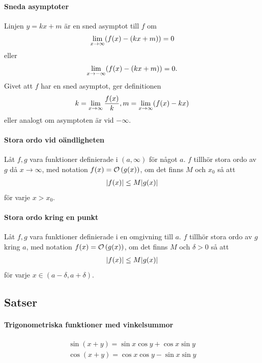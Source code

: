 \paragraph{Sneda asymptoter}
Linjen $y = kx + m$ är en sned asymptot till $f$ om
\begin{align*}
	\lim\limits_{x\to \infty}(f(x) - (kx + m)) = 0
\end{align*}
eller
\begin{align*}
	\lim\limits_{x\to -\infty}(f(x) - (kx + m)) = 0.
\end{align*}
Givet att $f$ har en sned asymptot, ger definitionen
\begin{align*}
	k = \lim\limits_{x\to \infty}\frac{f(x)}{k}, m = \lim\limits_{x\to \infty}(f(x) - kx)
\end{align*}
eller analogt om asymptoten är vid $-\infty$.

\paragraph{Stora ordo vid oändligheten}
Låt $f, g$ vara funktioner definierade i $(a, \infty)$ för något $a$. $f$ tillhör stora ordo av $g$ då $x\to\infty$, med notation $f(x) = \mathcal{O}\left(g(x)\right)$, om det finns $M$ och $x_0$ så att
\begin{align*}
	\abs{f(x)}\leq M\abs{g(x)}
\end{align*}
för varje $x > x_0$.

\paragraph{Stora ordo kring en punkt}
Låt $f, g$ vara funktioner definierade i en omgivning till $a$. $f$ tillhör stora ordo av $g$ kring $a$, med notation $f(x) = \mathcal{O}\left(g(x)\right)$, om det finns $M$ och $\delta > 0$ så att
\begin{align*}
	\abs{f(x)}\leq M\abs{g(x)}
\end{align*}
för varje $x\in(a - \delta, a + \delta)$.

\subsection{Satser}

\paragraph{Trigonometriska funktioner med vinkelsummor}
\begin{align*}
	\sin\left(x+y\right) = \sin x\cos y + \cos x\sin y\\
	\cos\left(x+y\right) = \cos x\cos y - \sin x\sin y
\end{align*}

